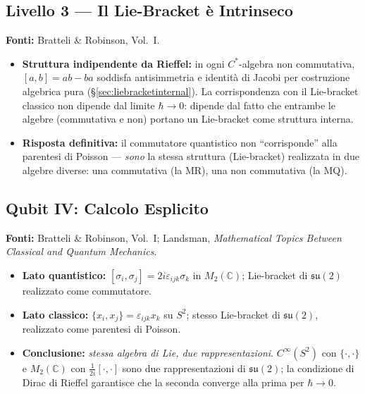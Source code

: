 \documentclass[12pt, a4paper]{article}
\newcommand{\fonti}[1]{%
	\begin{fontebox}
		\textcolor{fontecolor}{\footnotesize\textbf{Fonti:} #1}
	\end{fontebox}%
}
\begin{document}
	\subsection{Livello 3 --- Il Lie-Bracket è Intrinseco}
	
	\fonti{Bratteli \& Robinson, Vol.~I.}
	
	\begin{itemize}
		\item \textbf{Struttura indipendente da Rieffel:} in ogni $C^*$-algebra non
		commutativa, $[a,b] = ab - ba$ soddisfa antisimmetria e identità di Jacobi
		per costruzione algebrica pura (§\ref{sec:liebracketinternal}). La corrispondenza
		con il Lie-bracket classico non dipende dal limite $\hbar \to 0$: dipende dal
		fatto che entrambe le algebre (commutativa e non) portano un Lie-bracket come
		struttura interna.
		\item \textbf{Risposta definitiva:} il commutatore quantistico non ``corrisponde''
		alla parentesi di Poisson --- \emph{sono} la stessa struttura (Lie-bracket)
		realizzata in due algebre diverse: una commutativa (la MR), una non commutativa
		(la MQ).
	\end{itemize}
	
	\subsection{Qubit IV: Calcolo Esplicito}
	
	\fonti{Bratteli \& Robinson, Vol.~I; Landsman, \textit{Mathematical Topics Between
			Classical and Quantum Mechanics}.}
	
	\begin{itemize}
		\item \textbf{Lato quantistico:} $[\sigma_i, \sigma_j] = 2i\varepsilon_{ijk}\sigma_k$
		in $M_2(\mathbb{C})$; Lie-bracket di $\mathfrak{su}(2)$ realizzato come commutatore.
		\item \textbf{Lato classico:} $\{x_i, x_j\} = \varepsilon_{ijk} x_k$ su $S^2$;
		stesso Lie-bracket di $\mathfrak{su}(2)$, realizzato come parentesi di Poisson.
		\item \textbf{Conclusione:} \emph{stessa algebra di Lie, due rappresentazioni}.
		$C^\infty(S^2)$ con $\{\cdot,\cdot\}$ e $M_2(\mathbb{C})$ con
		$\frac{1}{2i}[\cdot,\cdot]$ sono due rappresentazioni di $\mathfrak{su}(2)$;
		la condizione di Dirac di Rieffel garantisce che la seconda converge alla prima
		per $\hbar \to 0$.
	\end{itemize}
	
\end{document}
